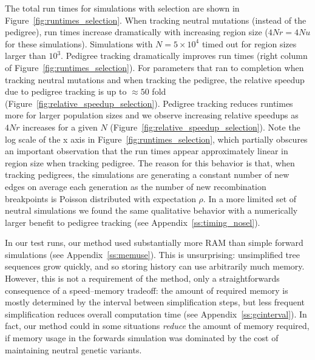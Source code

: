 \documentclass{article}
\begin{document}
The total run times for simulations with selection are shown in Figure~\ref{fig:runtimes_selection}.  When tracking
neutral mutations (instead of the pedigree), run times increase dramatically with increasing region size ($4Nr = 4Nu$ for
these simulations).  Simulations with $N=5 \times 10^4$ timed out for region sizes larger than $10^3$.
Pedigree tracking
dramatically improves run times (right column of Figure~\ref{fig:runtimes_selection}).  For parameters that ran to completion when tracking neutral mutations and when tracking
the pedigree, the relative speedup due to pedigree tracking is up to $\approx 50$ fold
(Figure~\ref{fig:relative_speedup_selection}).  Pedigree tracking reduces runtimes more for larger
population sizes and we observe increasing relative speedups as $4Nr$ increases for a given $N$
(Figure~\ref{fig:relative_speedup_selection}).
Note the log scale of the x axis in Figure~\ref{fig:runtimes_selection}, which
partially obscures an important observation that the run times appear approximately linear in region size when tracking
pedigree.  The reason for this behavior is that, when tracking pedigrees, the simulations are generating a constant number of new edges on average
each generation as the number of new recombination breakpoints is Poisson distributed with expectation $\rho$.
In a more limited set of neutral simulations we found the same qualitative
behavior with a numerically larger benefit to pedigree tracking (see Appendix~\ref{ss:timing_nosel}).

In our test runs, our method used substantially more RAM than simple forward simulations (see Appendix~\ref{ss:memuse}).
This is unsurprising:
unsimplified tree sequences grow quickly, and so storing history can use arbitrarily much memory.
However, this is not a requirement of the method, only a straightforwards consequence of a speed--memory tradeoff:
the amount of required memory is mostly determined by the interval between simplification steps,
but less frequent simplification reduces overall computation time (see Appendix~\ref{ss:gcinterval}).
In fact, our method could in some situations \emph{reduce} the amount of memory required,
if memory usage in the forwards simulation was dominated by the cost of maintaining neutral genetic variants.
\end{document}
